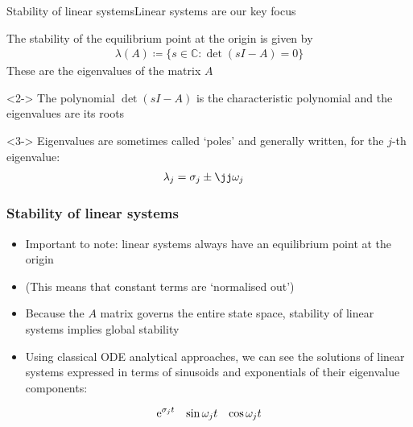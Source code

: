 \documentclass{beamer-control}
\begin{document}
\begin{frame}{Stability of linear systems}{Linear systems are our key focus}

The stability of the equilibrium point at the origin is given by 
\begin{align}
\lambda(A) \coloneq \{ s\in\mathbb{C} : \operatorname{det}(sI-A)=0 \}
\end{align}
\alert{These are the eigenvalues of the matrix $A$}
\bigskip

\begin{uncoverenv}<2->
The polynomial $\operatorname{det}(sI-A)$ is the characteristic polynomial and the eigenvalues are its roots
\end{uncoverenv}
\bigskip

\begin{uncoverenv}<3->
Eigenvalues are sometimes called `poles' and generally written, for the $j$-th eigenvalue:
\begin{align}
\lambda_j &= \sigma_j \pm \jj\ww_j
\end{align}
\end{uncoverenv}
\end{frame}

\begin{frame}
\frametitle{Stability of linear systems}
\begin{itemize}
\item Important to note: linear systems always have an equilibrium point at the origin
\item (This means that constant terms are `normalised out')
\item Because the $A$ matrix governs the entire state space, stability of linear systems implies global stability
\item Using classical ODE analytical approaches, we can see the solutions of linear systems expressed in terms of sinusoids and exponentials of their eigenvalue components:
\end{itemize}
\begin{align}
\mathrm{e}^{\sigma_j t} && \sin\omega_j t && \cos\omega_j t
\end{align}
\end{frame}
\end{document}
